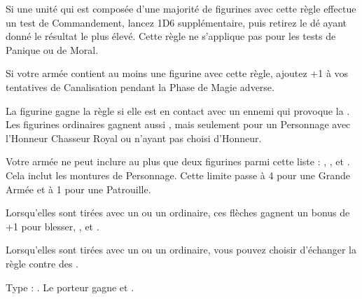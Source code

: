 

\startarmyspecialrules

\armyspecialruleentry{\martialdiscipline}

Si une unité qui est composée d'une majorité de figurines avec cette règle effectue un test de Commandement, lancez 1D6 supplémentaire, puis retirez le dé ayant donné le résultat le plus élevé. Cette règle ne s'applique pas pour les tests de Panique ou de Moral.

\armyspecialruleentry{\masterofbalance}

Si votre armée contient au moins une figurine avec cette règle, ajoutez +1 à vos tentatives de Canalisation pendant la Phase de Magie adverse.

\armyspecialruleentry{\valiant}

La figurine gagne la règle \stubborn{} si elle est en contact avec un ennemi qui provoque la \fear{}. Les figurines ordinaires gagnent aussi \bodyguard{\highprince{}, \commander{}}, mais seulement pour un Personnage avec l’Honneur Chasseur Royal ou n'ayant pas choisi d'Honneur.

\armyspecialruleentry{\lastoftheirkind}

Votre armée ne peut inclure au plus que deux figurines parmi cette liste : \youngdragons{}, \dragons{}, \firephoenixes{} et \frostphoenixes{}. Cela inclut les montures de Personnage. Cette limite passe à 4 pour une Grande Armée et à 1 pour une Patrouille.

\closearmyspecialrules

\vspace*{1.5cm}
\startarmyarmoury

\startitemlistonecol

\listitemonecol{\moonlightarrows}Lorsqu'elles sont tirées avec un \bow{} ou un \longbow{} ordinaire, ces flèches gagnent un bonus de +1 pour blesser, \flamingattacks{}, \magicalattacks{} et .

\listitemonecol{\bitterarrows}Lorsqu'elles sont tirées avec un \bow{} ou un \longbow{} ordinaire, vous pouvez choisir d'échanger la règle \volleyfire{} contre des \poisonedattacks{}. 

\listitemonecol{\dragonforgedarmour}Type : \ha{}. Le porteur gagne \fireborn{} et .

\enditemlistonecol

\closearmyarmoury








